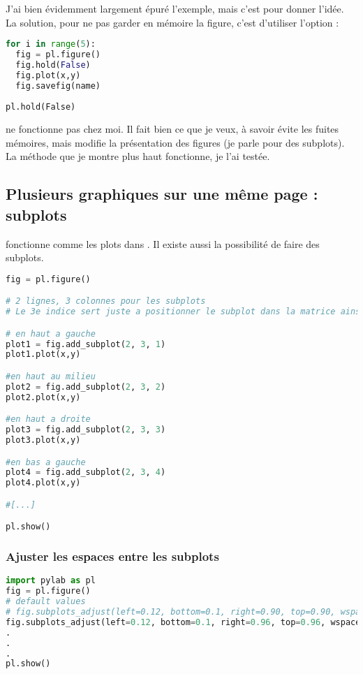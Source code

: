 \documentclass[a4paper,twoside]{article}
\begin{document}
J'ai bien évidemment largement épuré l'exemple, mais c'est pour donner l'idée. La solution, pour ne pas garder en mémoire la figure, c'est d'utiliser l'option : 
\begin{lstlisting}[language=python]
for i in range(5):
  fig = pl.figure()
  fig.hold(False)
  fig.plot(x,y)
  fig.savefig(name)
\end{lstlisting}

\begin{attention}
\begin{verbatim}
pl.hold(False)
\end{verbatim}
ne fonctionne pas chez moi. Il fait bien ce que je veux, à savoir évite les fuites mémoires, mais modifie la présentation des figures (je parle pour des subplots). La méthode que je montre plus haut fonctionne, je l'ai testée.
\end{attention}


\subsection{Plusieurs graphiques sur une même page : subplots}
 fonctionne comme les plots dans . Il existe aussi la possibilité de faire des subplots.

\begin{lstlisting}[language=python]
fig = pl.figure()

# 2 lignes, 3 colonnes pour les subplots
# Le 3e indice sert juste a positionner le subplot dans la matrice ainsi creee, balayant de gauche a droite puis de haut en bas.

# en haut a gauche
plot1 = fig.add_subplot(2, 3, 1)
plot1.plot(x,y)

#en haut au milieu
plot2 = fig.add_subplot(2, 3, 2)
plot2.plot(x,y)

#en haut a droite
plot3 = fig.add_subplot(2, 3, 3)
plot3.plot(x,y)

#en bas a gauche
plot4 = fig.add_subplot(2, 3, 4)
plot4.plot(x,y)

#[...]

pl.show()
\end{lstlisting}

\subsubsection{Ajuster les espaces entre les subplots}
\begin{lstlisting}[language=python]
import pylab as pl
fig = pl.figure()
# default values
# fig.subplots_adjust(left=0.12, bottom=0.1, right=0.90, top=0.90, wspace=0.20, hspace=0.20)
fig.subplots_adjust(left=0.12, bottom=0.1, right=0.96, top=0.96, wspace=0.26, hspace=0.26)
.
.
.
pl.show()
\end{lstlisting}
\end{document}

